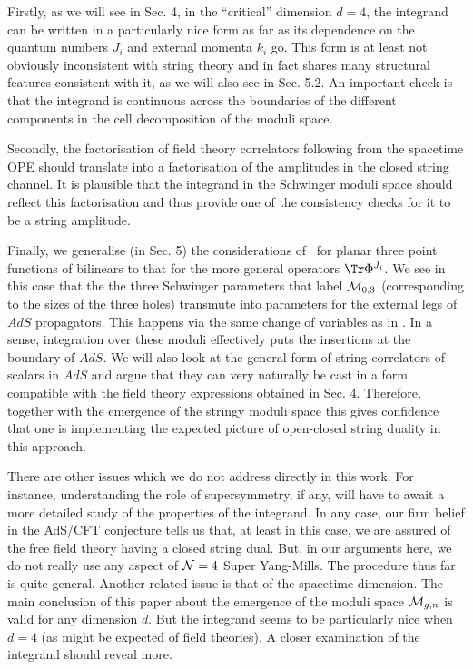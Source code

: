 Firstly, as we will see in Sec. 4, in the ``critical'' dimension
$d=4$, the integrand can be written in a particularly nice form as far
as its dependence on the quantum numbers $J_i$ and external momenta $k_i$
go. This form is at least not obviously inconsistent with string theory and
in fact shares many structural features consistent with it, as we will also 
see in Sec. 5.2. An important check is
that the integrand is continuous across the boundaries of the different
components in the cell decomposition of the moduli space.

Secondly, the factorisation of
field theory correlators following from the spacetime OPE should translate into
a factorisation of the amplitudes in the closed string channel. It is
plausible that the integrand in the Schwinger moduli space
should reflect this factorisation and thus provide one of the consistency
checks for it to be a string amplitude. 

Finally, we generalise (in Sec. 5)
the considerations of \ff\ for planar three point functions of bilinears to
that for the more general operators $\Tr\Phi^{J_i}$. We see
in this case that the the three Schwinger
parameters that label ${\cal M}_{0,3}$
(corresponding to the sizes of the three holes) transmute into
parameters for the external legs of $AdS$ propagators. This happens
via the same change  of variables as in \ff . In a
sense, integration over these moduli effectively puts the
insertions at the boundary of $AdS$. 
We will also look at the general form of string correlators 
of scalars in $AdS$ and argue 
that they can very naturally be cast in a form compatible 
with the field theory
expressions obtained in Sec. 4.  
Therefore, together with the emergence of the stringy moduli space 
this gives confidence that
one is implementing the expected picture of
open-closed string duality in this approach.

There are other issues which we do not address directly in this work.
For instance, understanding 
the role of supersymmetry, if any, will have to await 
a more detailed study of the properties of the integrand.
In any case, our firm belief
in the AdS/CFT conjecture tells us that, at least in this case, we
are assured of the free field theory having a closed string dual.
But, in our arguments here, we do not really use any aspect of
${\cal N}=4$ Super Yang-Mills. The procedure thus far is
quite general. Another related issue is that of the
spacetime dimension. The main conclusion of this paper about the
emergence of the moduli space ${\cal M}_{g,n}$ is valid for any
dimension $d$. But the integrand seems to be particularly nice
when $d=4$ (as might be expected of field theories).
A closer examination of the integrand
should reveal more.

